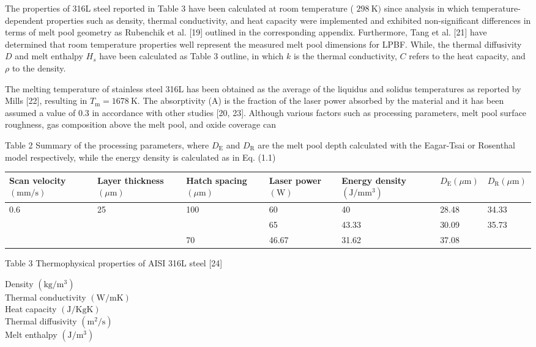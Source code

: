 \documentclass[10pt]{article}
\begin{document}
The properties of 316L steel reported in Table 3 have been calculated at room temperature ( $298 \mathrm{~K})$ since analysis in which temperature-dependent properties such as density, thermal conductivity, and heat capacity were implemented and exhibited non-significant differences in terms of melt pool geometry as Rubenchik et al. [19] outlined in the corresponding appendix. Furthermore, Tang et al. [21] have determined that room temperature properties well represent the measured melt pool dimensions for LPBF. While, the thermal diffusivity $D$ and melt enthalpy $H_{s}$ have been calculated as Table 3 outline, in which $k$ is the thermal conductivity, $C$ refers to the heat capacity, and $\rho$ to the density.

The melting temperature of stainless steel 316L has been obtained as the average of the liquidus and solidus temperatures as reported by Mills [22], resulting in $T_{\mathrm{m}}=1678 \mathrm{~K}$. The absorptivity (A) is the fraction of the laser power absorbed by the material and it has been assumed a value of 0.3 in accordance with other studies [20, 23]. Although various factors such as processing parameters, melt pool surface roughness, gas composition above the melt pool, and oxide coverage can

Table 2 Summary of the processing parameters, where $D_{\mathrm{E}}$ and $D_{\mathrm{R}}$ are the melt pool depth calculated with the Eagar-Tsai or Rosenthal model respectively, while the energy density is calculated as in Eq. (1.1)

\begin{center}
\begin{tabular}{lllllll}
\hline
Scan velocity $(\mathrm{mm} / \mathrm{s})$ & Layer thickness $(\mu \mathrm{m})$ & Hatch spacing $(\mu \mathrm{m})$ & Laser power $(\mathrm{W})$ & Energy density $\left(\mathrm{J} / \mathrm{mm}^{3}\right)$ & $D_{\mathrm{E}}(\mu \mathrm{m})$ & $D_{\mathrm{R}}(\mu \mathrm{m})$ \\
\hline
0.6 & 25 & 100 & 60 & 40 & 28.48 & 34.33 \\
 &  &  & 65 & 43.33 & 30.09 & 35.73 \\
 &  & 70 & 46.67 & 31.62 & 37.08 &  \\
\hline
\end{tabular}
\end{center}

Table 3 Thermophysical properties of AISI 316L steel [24]

Density $\left(\mathrm{kg} / \mathrm{m}^{3}\right)$\\
Thermal conductivity $(\mathrm{W} / \mathrm{m} \mathrm{K})$\\
Heat capacity $(\mathrm{J} / \mathrm{Kg} \mathrm{K})$\\
Thermal diffusivity $\left(\mathrm{m}^{2} / \mathrm{s}\right)$\\
Melt enthalpy $\left(\mathrm{J} / \mathrm{m}^{3}\right)$
\end{document}
